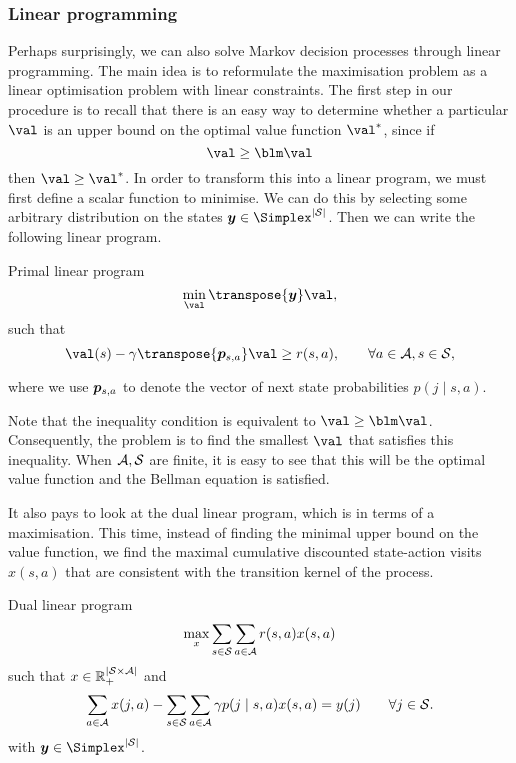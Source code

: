 \subsubsection{Linear programming}
\label{sec:linear-programming}
Perhaps surprisingly, we can also solve Markov decision processes through linear programming. The main idea is to reformulate the maximisation problem as a linear optimisation problem with linear constraints. 
The first step in our procedure is to recall that there is an easy way to determine whether a particular $\val$ is an upper bound on the optimal value function $\val^*$, since if
\[
\val \geq \blm \val
\]
then $\val \geq \val^*$. In order to transform this into a linear program, we must first define a scalar function to minimise. We can do this by selecting some arbitrary distribution on the states $\vectorsym{y} \in \Simplex^{|\CS|}$. %
Then we can write the following linear program.
\begin{block}{Primal linear program}
  \[
  \min_\val \transpose{\vectorsym{y}} \val,
  \]
  such that
  \[
  \val(s) - \disc \transpose{\vectorsym{p}_{s,a}} \val \geq r(s,a), %
  \qquad \forall a \in \CA, s \in \CS,
  \]
\end{block}
where we use $\vectorsym{p}_{s,a}$ to denote the vector of next state probabilities $p(j \mid s, a)$.

Note that the inequality condition is equivalent to $\val \geq \blm \val$.
Consequently, the problem is to find the smallest $\val$ that satisfies this inequality. When ${\mathcal{A}}, {\mathcal{S}}$ are finite, it is easy to see that this will be the optimal value function and the Bellman equation is satisfied.

It also pays to look at the dual linear program, which is in terms of a maximisation. This time, instead of finding the minimal upper bound on the value function, we find the maximal cumulative discounted state-action visits $x(s,a)$ that are consistent with the transition kernel of the process. 

\begin{block}{Dual linear program}
  \[
  \max_x \sum_{s \in {\mathcal{S}}} \sum_{a \in {\mathcal{A}}} r(s,a) x(s,a)
  \]
  such that $x \in {\mathbb{R}}_+^{|{\mathcal{S}} \times {\mathcal{A}}|}$ and
  \[
  \sum_{a \in {\mathcal{A}}} x(j,a) - \sum_{s \in {\mathcal{S}}} \sum_{a \in {\mathcal{A}}} \gamma
  p(j \mid s,a) x(s,a) = y(j) \qquad \forall j \in {\mathcal{S}}.
  \]
  with $\vectorsym{y} \in \Simplex^{|\CS|}$.
\end{block}

